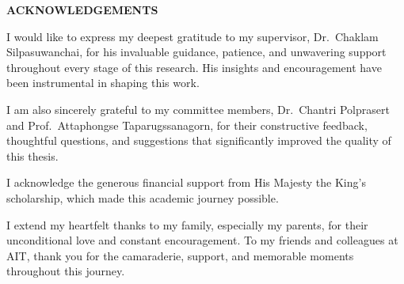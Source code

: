 {}
\begin{center}
    \large{\bf ACKNOWLEDGEMENTS}
\end{center}

I would like to express my deepest gratitude to my supervisor, Dr.\ Chaklam Silpasuwanchai, for his invaluable guidance, patience, and unwavering support throughout every stage of this research. His insights and encouragement have been instrumental in shaping this work.

I am also sincerely grateful to my committee members, Dr.\ Chantri Polprasert and Prof.\ Attaphongse Taparugssanagorn, for their constructive feedback, thoughtful questions, and suggestions that significantly improved the quality of this thesis.

I acknowledge the generous financial support from His Majesty the King's scholarship, which made this academic journey possible.

I extend my heartfelt thanks to my family, especially my parents, for their unconditional love and constant encouragement. To my friends and colleagues at AIT, thank you for the camaraderie, support, and memorable moments throughout this journey.
